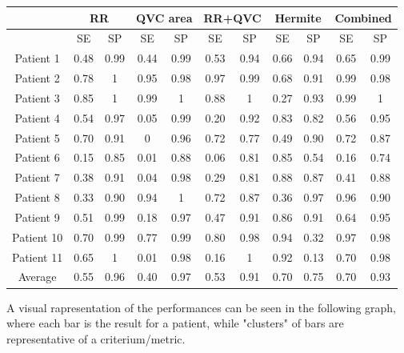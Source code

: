 \documentclass[a4paper,titlepage]{article}
\begin{document}
\providecommand{\tabularnewline}{\\}
		
\makeatother
\begin{tabular}{|c|c|c|c|c|c|c|c|c|c|c|}
\hline 
 & \multicolumn{2}{c|}{RR} & \multicolumn{2}{c|}{QVC area} & \multicolumn{2}{c|}{RR+QVC} & \multicolumn{2}{c|}{Hermite} & \multicolumn{2}{c|}{Combined}\tabularnewline
\hline 
 & SE & SP & SE & SP & SE & SP & SE & SP & SE & SP\tabularnewline
\hline 
Patient 1 & 0.48 & 0.99 & 0.44 & 0.99 & 0.53 & 0.94 & 0.66 & 0.94 & 0.65 & 0.99\tabularnewline
\hline 
Patient 2 & 0.78 & 1 & 0.95 & 0.98 & 0.97 & 0.99 & 0.68 & 0.91 & 0.99 & 0.98\tabularnewline
\hline 
Patient 3 & 0.85 & 1 & 0.99 & 1 & 0.88 & 1 & 0.27 & 0.93 & 0.99 & 1\tabularnewline
\hline 
Patient 4 & 0.54 & 0.97 & 0.05 & 0.99 & 0.20 & 0.92 & 0.83 & 0.82 & 0.56 & 0.95\tabularnewline
\hline 
Patient 5 & 0.70 & 0.91 & 0 & 0.96 & 0.72 & 0.77 & 0.49 & 0.90 & 0.72 & 0.87\tabularnewline
\hline 
Patient 6 & 0.15 & 0.85 & 0.01 & 0.88 & 0.06 & 0.81 & 0.85 & 0.54 & 0.16 & 0.74\tabularnewline
\hline 
Patient 7 & 0.38 & 0.91 & 0.04 & 0.98 & 0.29 & 0.81 & 0.88 & 0.87 & 0.41 & 0.88\tabularnewline
\hline 
Patient 8 & 0.33 & 0.90 & 0.94 & 1 & 0.72 & 0.87 & 0.36 & 0.97 & 0.96 & 0.90\tabularnewline
\hline 
Patient 9 & 0.51 & 0.99 & 0.18 & 0.97 & 0.47 & 0.91 & 0.86 & 0.91 & 0.64 & 0.95\tabularnewline
\hline 
Patient 10 & 0.70 & 0.99 & 0.77 & 0.99 & 0.80 & 0.98 & 0.94 & 0.32 & 0.97 & 0.98\tabularnewline
\hline 
Patient 11 & 0.65 & 1 & 0.01 & 0.98 & 0.16 & 1 & 0.92 & 0.13 & 0.70 & 0.98\tabularnewline
\hline 
Average & 0.55 & 0.96 & 0.40 & 0.97 & 0.53 & 0.91 & 0.70 & 0.75 & 0.70 & 0.93\tabularnewline
\hline 
\end{tabular}

\hfill \break
A visual rapresentation of the performances can be seen in the following graph, where each bar is the result for a patient, while "clusters" of bars are representative of a criterium/metric.
\end{document}
